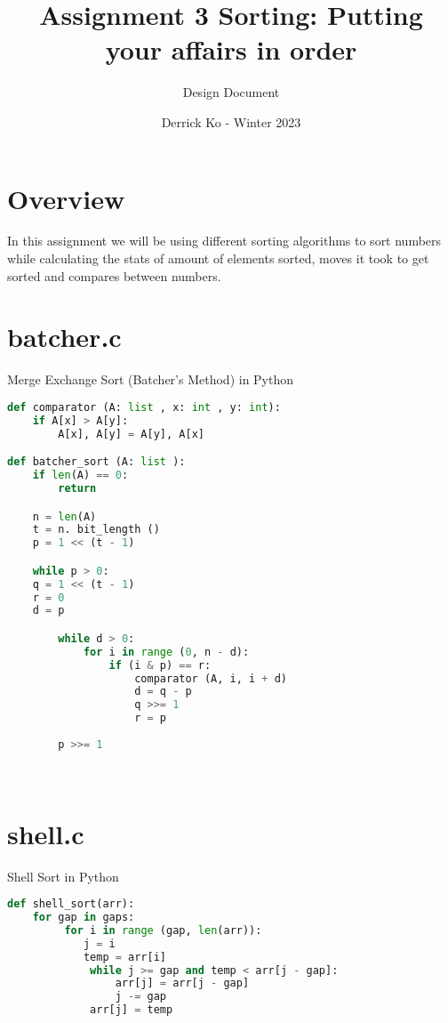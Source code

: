 \documentclass{article}
\title{Assignment 3 Sorting: Putting your affairs in order}
\author{Design Document}
\date{Derrick Ko - Winter 2023}
\begin{document}
\maketitle
\section{Overview}
In this assignment we will be using different sorting algorithms to sort numbers while calculating the stats of amount of elements sorted, moves it took to get sorted and compares between numbers.
\section{batcher.c}
Merge Exchange Sort (Batcher’s Method) in Python
\begin{lstlisting}[language=Python]
def comparator (A: list , x: int , y: int):
    if A[x] > A[y]:
        A[x], A[y] = A[y], A[x]

def batcher_sort (A: list ):
    if len(A) == 0:
        return

    n = len(A)
    t = n. bit_length ()
    p = 1 << (t - 1)

    while p > 0:
    q = 1 << (t - 1)
    r = 0
    d = p

        while d > 0:
            for i in range (0, n - d):
                if (i & p) == r:
                    comparator (A, i, i + d)
                    d = q - p
                    q >>= 1
                    r = p
        
        p >>= 1
\end{lstlisting}\
\\ [4\baselineskip]
\section{shell.c}
Shell Sort in Python
\begin{lstlisting}[language=Python]
 def shell_sort(arr):
    for gap in gaps:
         for i in range (gap, len(arr)):
            j = i
            temp = arr[i]
             while j >= gap and temp < arr[j - gap]:
                 arr[j] = arr[j - gap]
                 j -= gap
             arr[j] = temp
 \end{lstlisting}
\end{document}
